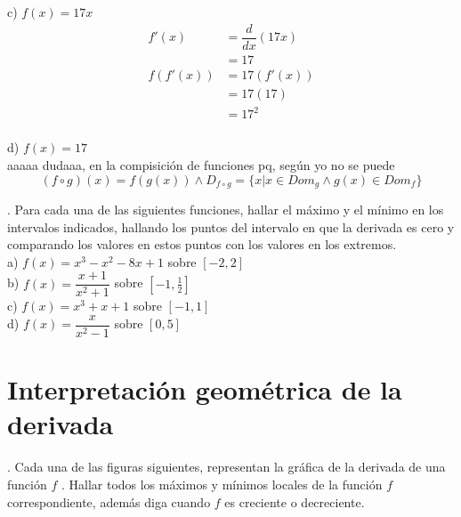\documentclass[letterpaper]{article}
\newcommand{\de}{\dfrac{d}{dx}}
\begin{document}
c) $ f(x) = 17x $\\

\begin{align*}
	f'(x)&= \de \left( 17x \right) \\
	&= 17\\
	f(f'(x)) &= 17(f'(x))\\
	&= 17(17)\\
	&= 17^{2}\\
\end{align*}

d) $ f(x) = 17 $\\

aaaaa dudaaa, en la compisición de funciones pq, según yo no se puede
\[
(f \circ g) (x) = f(g(x)) \land D_{f\circ g} = \{ x | x \in Dom_g \land g(x) \in Dom_f \}
\]

. Para cada una de las siguientes funciones, hallar el máximo y el mínimo en los intervalos indicados, hallando los puntos del intervalo en que la derivada es cero y comparando los valores en estos puntos con los valores en los extremos.\\

a) $ f(x) = x^{3} -x^{2} -8x +1$ sobre $ [-2,2] $\\


b) $ f(x) = \dfrac{x+1}{x^{2}+1}$ sobre $ [-1,\frac{1}{2}] $\\


c) $ f(x) = x^{3} +x +1$ sobre $ [-1,1] $\\


d) $ f(x) = \dfrac{x}{x^{2} - 1}$ sobre $ [0,5] $\\


\section*{Interpretación geométrica de la derivada}

. Cada una de las figuras siguientes, representan la gráfica de la derivada de una función $ f $ . Hallar todos los máximos y mínimos locales de la función $ f $ correspondiente, además diga cuando $ f $ es creciente o decreciente.\\
\end{document}

